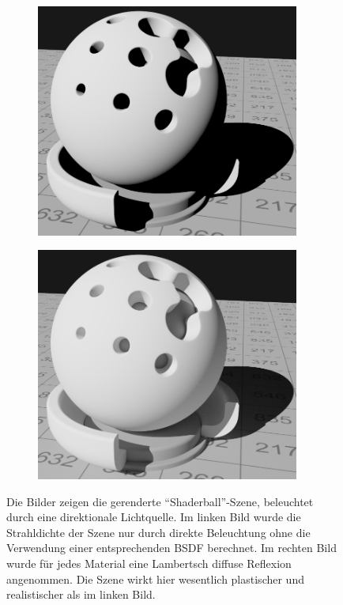 		\begin{figure}
			\begin{subfigure}[b]{0.5\textwidth}
				\center
				\includegraphics[width=0.95\textwidth]{pic/shaderball-bsdf-0.png}
			\end{subfigure}
			\begin{subfigure}[b]{0.5\textwidth}
				\center
				\includegraphics[width=0.95\textwidth]{pic/shaderball-bsdf-10.png}
			\end{subfigure}
			\caption[Unterschied direkter und indirekter Beleuchtung anhand der \enquote{Shaderball}-Szene]{Die Bilder zeigen die gerenderte \enquote{Shaderball}-Szene, beleuchtet durch eine direktionale Lichtquelle. Im linken Bild wurde die Strahldichte der Szene nur durch direkte Beleuchtung ohne die Verwendung einer entsprechenden BSDF berechnet. Im rechten Bild wurde für jedes Material eine Lambertsch diffuse Reflexion angenommen. Die Szene wirkt hier wesentlich plastischer und realistischer als im linken Bild.}
			\label{fig:shaderball-bsdf}
		\end{figure}

